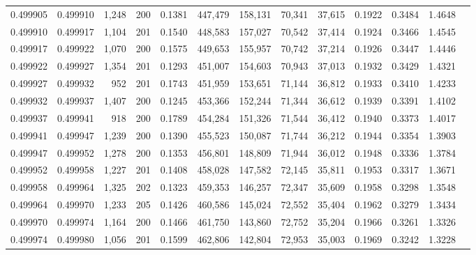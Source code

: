 \begin{tabular}{rrrrrrrrrrrrr}
0.499905 & 0.499910 & 1,248 & 200 &                                     0.1381 & 447,479 & 158,131 &  70,341 &  37,615 & 0.1922 & 0.3484 & 1.4648 \\
0.499910 & 0.499917 & 1,104 & 201 &                                     0.1540 & 448,583 & 157,027 &  70,542 &  37,414 & 0.1924 & 0.3466 & 1.4545 \\
0.499917 & 0.499922 & 1,070 & 200 &                                     0.1575 & 449,653 & 155,957 &  70,742 &  37,214 & 0.1926 & 0.3447 & 1.4446 \\
0.499922 & 0.499927 & 1,354 & 201 &                                     0.1293 & 451,007 & 154,603 &  70,943 &  37,013 & 0.1932 & 0.3429 & 1.4321 \\
0.499927 & 0.499932 &   952 & 201 &                                     0.1743 & 451,959 & 153,651 &  71,144 &  36,812 & 0.1933 & 0.3410 & 1.4233 \\
0.499932 & 0.499937 & 1,407 & 200 &                                     0.1245 & 453,366 & 152,244 &  71,344 &  36,612 & 0.1939 & 0.3391 & 1.4102 \\
0.499937 & 0.499941 &   918 & 200 &                                     0.1789 & 454,284 & 151,326 &  71,544 &  36,412 & 0.1940 & 0.3373 & 1.4017 \\
0.499941 & 0.499947 & 1,239 & 200 &                                     0.1390 & 455,523 & 150,087 &  71,744 &  36,212 & 0.1944 & 0.3354 & 1.3903 \\
0.499947 & 0.499952 & 1,278 & 200 &                                     0.1353 & 456,801 & 148,809 &  71,944 &  36,012 & 0.1948 & 0.3336 & 1.3784 \\
0.499952 & 0.499958 & 1,227 & 201 &                                     0.1408 & 458,028 & 147,582 &  72,145 &  35,811 & 0.1953 & 0.3317 & 1.3671 \\
0.499958 & 0.499964 & 1,325 & 202 &                                     0.1323 & 459,353 & 146,257 &  72,347 &  35,609 & 0.1958 & 0.3298 & 1.3548 \\
0.499964 & 0.499970 & 1,233 & 205 &                                     0.1426 & 460,586 & 145,024 &  72,552 &  35,404 & 0.1962 & 0.3279 & 1.3434 \\
0.499970 & 0.499974 & 1,164 & 200 &                                     0.1466 & 461,750 & 143,860 &  72,752 &  35,204 & 0.1966 & 0.3261 & 1.3326 \\
0.499974 & 0.499980 & 1,056 & 201 &                                     0.1599 & 462,806 & 142,804 &  72,953 &  35,003 & 0.1969 & 0.3242 & 1.3228 \\

\end{tabular}
